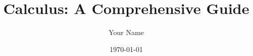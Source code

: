 \documentclass[12pt,a4paper]{book}
\begin{document}
\frontmatter
\title{Calculus: A Comprehensive Guide}
\author{Your Name}
\date{\today}
\maketitle

\tableofcontents

\mainmatter




\appendix
% 
% 

\backmatter
% 
% 
\end{document}
